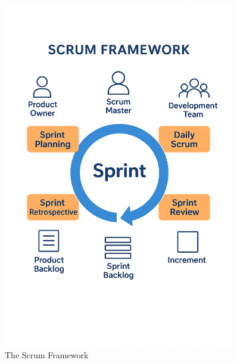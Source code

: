 \begin{figure}[H]
    \centering
    \includegraphics[width=0.9\textwidth]{chapters/chapter 1/figures/ScrumFramwork.png}
    \caption{The Scrum Framework}
    \label{fig:scrum}
\end{figure}

